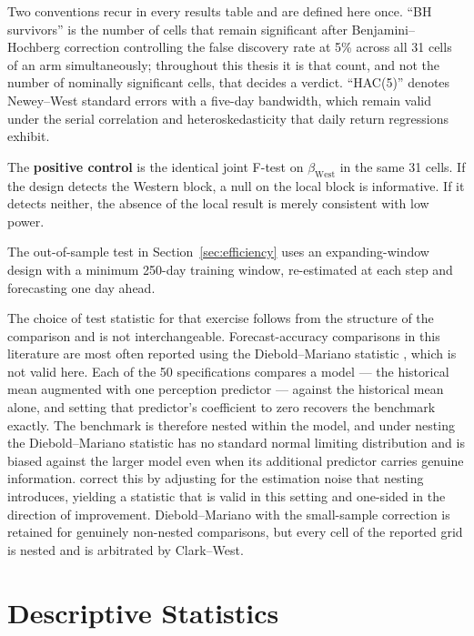 \documentclass[12pt,a4paper]{article}
\begin{document}
Two conventions recur in every results table and are defined here once. ``BH survivors'' is the number of cells that remain significant after Benjamini--Hochberg correction \citep{benjamini1995} controlling the false discovery rate at 5\% across all 31 cells of an arm simultaneously; throughout this thesis it is that count, and not the number of nominally significant cells, that decides a verdict. ``HAC(5)'' denotes Newey--West standard errors \citep{newey1987} with a five-day bandwidth, which remain valid under the serial correlation and heteroskedasticity that daily return regressions exhibit.

The \textbf{positive control} is the identical joint F-test on $\beta_{\mathrm{West}}$ in the same 31 cells. If the design detects the Western block, a null on the local block is informative. If it detects neither, the absence of the local result is merely consistent with low power.

The out-of-sample test in Section~\ref{sec:efficiency} uses an expanding-window design with a minimum 250-day training window, re-estimated at each step and forecasting one day ahead.

The choice of test statistic for that exercise follows from the structure of the comparison and is not interchangeable. Forecast-accuracy comparisons in this literature are most often reported using the Diebold--Mariano statistic \citep{diebold1995}, which is not valid here. Each of the 50 specifications compares a model --- the historical mean augmented with one perception predictor --- against the historical mean alone, and setting that predictor's coefficient to zero recovers the benchmark exactly. The benchmark is therefore nested within the model, and under nesting the Diebold--Mariano statistic has no standard normal limiting distribution and is biased against the larger model even when its additional predictor carries genuine information. \citet{clark2007} correct this by adjusting for the estimation noise that nesting introduces, yielding a statistic that is valid in this setting and one-sided in the direction of improvement. Diebold--Mariano with the \citet{harvey1997} small-sample correction is retained for genuinely non-nested comparisons, but every cell of the reported grid is nested and is arbitrated by Clark--West.

\section{Descriptive Statistics}
\label{sec:descriptive}
\end{document}
